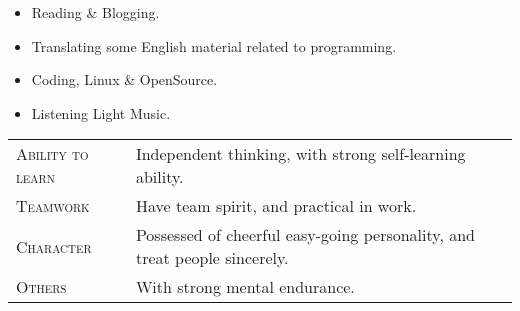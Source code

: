 \documentclass[a4paper, 10pt, titlepage]{article}
\begin{document}

\begin{itemize}
\item Reading \& Blogging.
\item Translating some English material related to programming.
\item Coding, Linux \& OpenSource.
\item Listening Light Music.
\end{itemize}



\begin{tabular}{ll}
 	\textsc{Ability to learn} & Independent thinking, with strong self-learning ability.\\
	\textsc{Teamwork} & Have team spirit, and practical in work.\\
	\textsc{Character} & Possessed of cheerful easy-going personality, and treat people sincerely.\\
	\textsc{Others} & With strong mental endurance.\\
\end{tabular}
\end{document}
